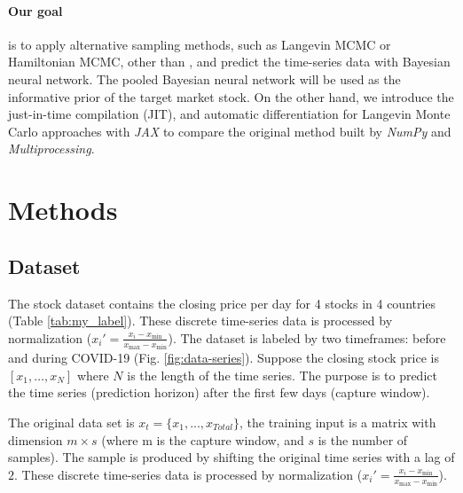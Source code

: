 \documentclass{article}
\begin{document}
\paragraph{Our goal} is to apply alternative sampling methods, such as Langevin MCMC or Hamiltonian MCMC, other than \citep{chandra2019langevin}, and predict the time-series data with Bayesian neural network. The pooled Bayesian neural network will be used as the informative prior of the target market stock. On the other hand, we introduce the just-in-time compilation (JIT), and automatic differentiation for Langevin Monte Carlo approaches with \textit{JAX}\citep{jax2018github} to compare the original method built by \textit{NumPy} and \textit{Multiprocessing}\citep{chandra2021bayesian}. %



\section{Methods}


\subsection{Dataset}

The stock dataset contains the closing price per day for 4 stocks in 4 countries (Table \ref{tab:my_label}). These discrete time-series data is processed by normalization ($x_{i}' = \frac{x_{i} - x_{\min}}{x_{\max} - x_{\min}}$). The dataset is labeled by two timeframes: before and during COVID-19 (Fig. \ref{fig:data-series}). Suppose the closing stock price is $[x_1, \dots, x_N]$ where $N$ is the length of the time series. The purpose is to predict the time series (prediction horizon) after the first few days (capture window).



The original data set is $x_t = \{x_{1}, ..., x_{Total}\}$, the training input is a matrix with dimension $m \times s$ (where m is the capture window, and $s$ is the number of samples). The sample is produced by shifting the original time series with a lag of $2$.  These discrete time-series data is processed by normalization ($x_{i}' = \frac{x_{i} - x_{\min}}{x_{\max} - x_{\min}}$). 
\end{document}
